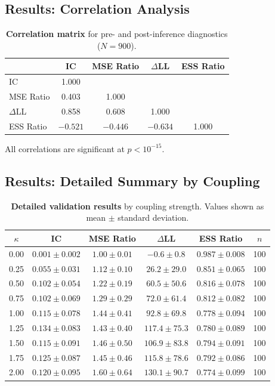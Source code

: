 \documentclass[10pt]{article} %
\theoremstyle{plain}
\theoremstyle{definition}
\begin{document}
\subsection{Results: Correlation Analysis}

\begin{table}[!htbp]
\centering
\caption{\textbf{Correlation matrix} for pre- and post-inference diagnostics ($N = 900$).}
\label{tab:correlation-matrix}
\begin{tabular}{lcccc}
\toprule
 & IC & MSE Ratio & $\Delta$LL & ESS Ratio \\
\midrule
IC & 1.000 & & & \\
MSE Ratio & 0.403 & 1.000 & & \\
$\Delta$LL & 0.858 & 0.608 & 1.000 & \\
ESS Ratio & $-0.521$ & $-0.446$ & $-0.634$ & 1.000 \\
\bottomrule
\end{tabular}
\end{table}

\noindent All correlations are significant at $p < 10^{-15}$.

\subsection{Results: Detailed Summary by Coupling}

\begin{table}[!htbp]
\centering
\caption{\textbf{Detailed validation results} by coupling strength. Values shown as mean $\pm$ standard deviation.}
\label{tab:detailed-validation}
\begin{tabular}{cccccc}
\toprule
$\kappa$ & IC & MSE Ratio & $\Delta$LL & ESS Ratio & $n$ \\
\midrule
0.00 & $0.001 \pm 0.002$ & $1.00 \pm 0.01$ & $-0.6 \pm 0.8$ & $0.987 \pm 0.008$ & 100 \\
0.25 & $0.055 \pm 0.031$ & $1.12 \pm 0.10$ & $26.2 \pm 29.0$ & $0.851 \pm 0.065$ & 100 \\
0.50 & $0.102 \pm 0.054$ & $1.22 \pm 0.19$ & $60.5 \pm 50.6$ & $0.816 \pm 0.078$ & 100 \\
0.75 & $0.102 \pm 0.069$ & $1.29 \pm 0.29$ & $72.0 \pm 61.4$ & $0.812 \pm 0.082$ & 100 \\
1.00 & $0.115 \pm 0.078$ & $1.44 \pm 0.41$ & $92.8 \pm 69.8$ & $0.778 \pm 0.094$ & 100 \\
1.25 & $0.134 \pm 0.083$ & $1.43 \pm 0.40$ & $117.4 \pm 75.3$ & $0.780 \pm 0.089$ & 100 \\
1.50 & $0.115 \pm 0.091$ & $1.46 \pm 0.50$ & $106.9 \pm 83.8$ & $0.794 \pm 0.091$ & 100 \\
1.75 & $0.125 \pm 0.087$ & $1.45 \pm 0.46$ & $115.8 \pm 78.6$ & $0.792 \pm 0.086$ & 100 \\
2.00 & $0.120 \pm 0.095$ & $1.60 \pm 0.64$ & $130.1 \pm 90.7$ & $0.774 \pm 0.099$ & 100 \\
\bottomrule
\end{tabular}
\end{table}
\end{document}
